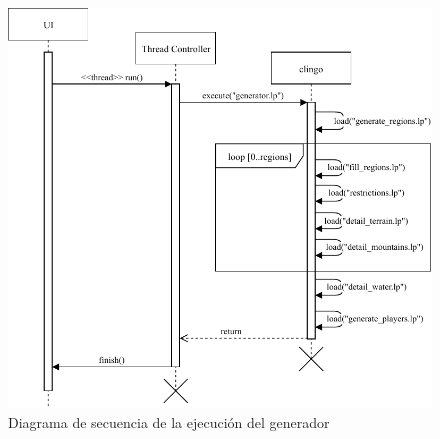 \begin{figure}[!h]
	\centering
	\includegraphics[width=\textwidth]{images/secuencia.pdf}
	\caption{Diagrama de secuencia de la ejecución del generador}
	\label{fig:sequence}
\end{figure}